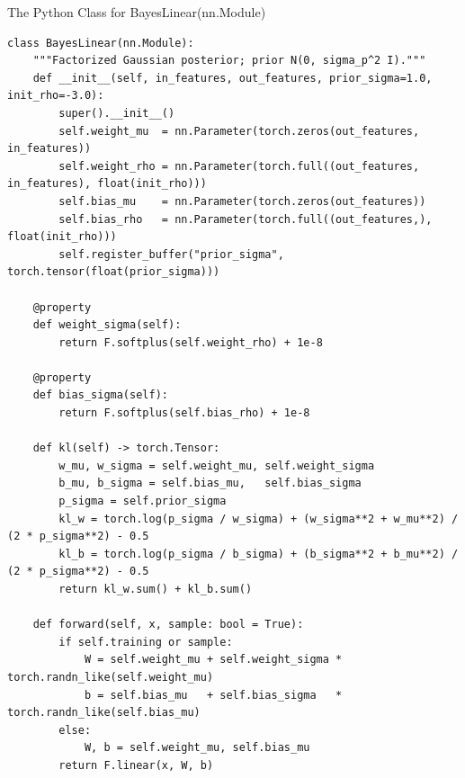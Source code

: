 \documentclass{article}
\begin{document}
\begin{listing}[!ht]
\caption{The Python Class for BayesLinear(nn.Module)}
\label{lst:bayes}
\begin{verbatim}
class BayesLinear(nn.Module):
    """Factorized Gaussian posterior; prior N(0, sigma_p^2 I)."""
    def __init__(self, in_features, out_features, prior_sigma=1.0, init_rho=-3.0):
        super().__init__()
        self.weight_mu  = nn.Parameter(torch.zeros(out_features, in_features))
        self.weight_rho = nn.Parameter(torch.full((out_features, in_features), float(init_rho)))
        self.bias_mu    = nn.Parameter(torch.zeros(out_features))
        self.bias_rho   = nn.Parameter(torch.full((out_features,), float(init_rho)))
        self.register_buffer("prior_sigma", torch.tensor(float(prior_sigma)))

    @property
    def weight_sigma(self):
        return F.softplus(self.weight_rho) + 1e-8

    @property
    def bias_sigma(self):
        return F.softplus(self.bias_rho) + 1e-8

    def kl(self) -> torch.Tensor:
        w_mu, w_sigma = self.weight_mu, self.weight_sigma
        b_mu, b_sigma = self.bias_mu,   self.bias_sigma
        p_sigma = self.prior_sigma
        kl_w = torch.log(p_sigma / w_sigma) + (w_sigma**2 + w_mu**2) / (2 * p_sigma**2) - 0.5
        kl_b = torch.log(p_sigma / b_sigma) + (b_sigma**2 + b_mu**2) / (2 * p_sigma**2) - 0.5
        return kl_w.sum() + kl_b.sum()

    def forward(self, x, sample: bool = True):
        if self.training or sample:
            W = self.weight_mu + self.weight_sigma * torch.randn_like(self.weight_mu)
            b = self.bias_mu   + self.bias_sigma   * torch.randn_like(self.bias_mu)
        else:
            W, b = self.weight_mu, self.bias_mu
        return F.linear(x, W, b)
\end{verbatim}
\end{listing}
\end{document}
